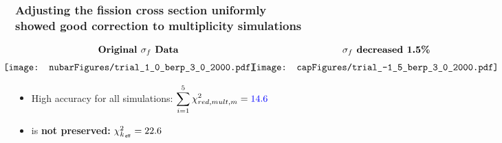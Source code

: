 \begin{frame}
    \frametitle{Adjusting the fission cross section \textbf{uniformly} \\ showed good correction to multiplicity
simulations}
\begin{center}
$\begin{array}{cc} \textbf{Original \sfiss Data} & \hspace{0.13in}\textbf{\sfiss decreased
    1.5\%} \\[6pt]
   \hspace{-0.25in}
\texttt{[image: nubarFigures/trial\_1\_0\_berp\_3\_0\_2000.pdf]} &
\hspace{-0.2in}\texttt{[image: capFigures/trial\_-1\_5\_berp\_3\_0\_2000.pdf]} \\
\end{array}$
\end{center}
\begin{itemize} \vspace{-0.1in} 
  \item High accuracy for all simulations: $\displaystyle \sum_{i=1}^5 \chi^2_{red,mult,m} = {\color{blue} 14.6}$
      \vspace{-0.2in}
  \item \keff is \textbf{not preserved:} $\chi^2_{k_{\,\mathsf{eff}}} = 22.6$
\end{itemize} 
\end{frame}






